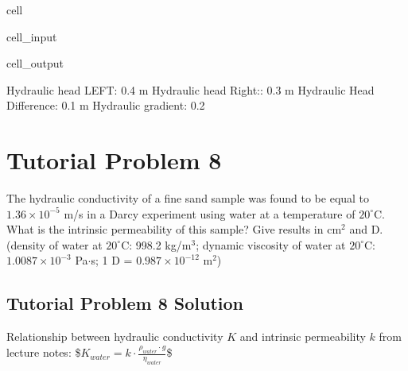 \documentclass[letterpaper,10pt,english]{jupyterBook}
\begin{document}
\begin{sphinxuseclass}{cell}
\begin{sphinxVerbatimInput}
\begin{sphinxuseclass}{cell_input}
\end{sphinxuseclass}\end{sphinxVerbatimInput}
\begin{sphinxVerbatimOutput}

\begin{sphinxuseclass}{cell_output}
\begin{sphinxVerbatim}[commandchars=\\\{\}]
Hydraulic head LEFT: 0.4 m
Hydraulic head Right:: 0.3 m
Hydraulic Head Difference: \PYGZhy{}0.1 m
Hydraulic gradient: \PYGZhy{}0.2
\end{sphinxVerbatim}

\end{sphinxuseclass}\end{sphinxVerbatimOutput}

\end{sphinxuseclass}

\section{Tutorial Problem 8}
\label{\detokenize{content/tutorials/T3/tutorial_03:tutorial-problem-8}}
\sphinxAtStartPar
The hydraulic conductivity of a fine sand sample was found to be equal to \(1.36\times 10^{-5}\) m/s in a Darcy experiment using water at a temperature of \(20^\circ\)C. What is the intrinsic permeability of this sample? Give results in cm\(^2\) and D.
(density of water at \(20^\circ\)C: 998.2 kg/m\(^3\); dynamic viscosity of water at \(20^\circ\)C: \(1.0087 \times 10^{-3}\) Pa\(\cdot\)s;  1 D = \(0.987\times 10^{-12}\) m\(^2\))


\subsection{Tutorial Problem 8  \sphinxhyphen{} Solution}
\label{\detokenize{content/tutorials/T3/tutorial_03:tutorial-problem-8-solution}}
\sphinxAtStartPar
{}

\sphinxAtStartPar
Relationship between hydraulic conductivity \(K\) and intrinsic permeability \(k\) from lecture notes:
\$\(
K_{water} = k\cdot \frac{\rho_{water}\cdot g}{\eta_{water}}
\)\$
\end{document}
